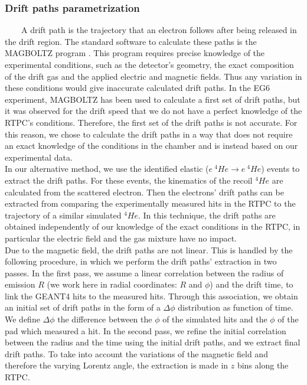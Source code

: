 \subsubsection{Drift paths parametrization}
~~~~A drift path is the trajectory that an electron follows after being released in the drift region. The standard software to calculate these paths is the MAGBOLTZ program \cite{MAGBOLTZ}. This program requires precise knowledge of the experimental conditions, such as the detector's geometry, the exact composition of the drift gas and the applied electric and magnetic fields. Thus any variation in these conditions would give inaccurate calculated drift paths. In the EG6 experiment, MAGBOLTZ has been used to calculate a first set of drift paths, but it was observed for the drift speed that we do not have a perfect knowledge of the RTPC's conditions. Therefore, the first set of the drift paths is not accurate. For this reason, we chose to calculate the drift paths in a way that does not require an exact knowledge of the conditions in the chamber and is instead based on our experimental data. \\

In our alternative method, we use the identified elastic ($e ~ ^{4}He \rightarrow e ~ ^{4}He$) events to extract the drift paths. For these events, the kinematics of the recoil $^{4}He$ are calculated from the scattered electron. Then the electrons' drift paths can be extracted from comparing the experimentally measured hits in the RTPC to the trajectory of a similar simulated $^{4}He$. In this technique, the drift paths are obtained independently of our knowledge of the exact conditions in the RTPC, in particular the electric field and the gas mixture have no impact. \\

Due to the magnetic field, the drift paths are not linear. This is handled by 
the following procedure, in which we perform the drift paths' extraction in 
two passes. In the first pass, we assume a linear correlation between the 
radius of emission $R$ (we work here in radial coordinates: $R$ and $\phi$) and the 
drift time, to link the GEANT4 hits to the measured hits. Through this association, we obtain an 
initial set of drift paths in the form of a $\Delta \phi$ distribution as function of time. We define $\Delta \phi$ the 
difference between the $\phi$ of the simulated hits and the $\phi$ of the pad 
which measured a hit. In the second pass, we refine the initial 
correlation between the radius and the time using the initial drift paths, and 
we extract final drift paths. To take into account the variations of the magnetic 
field and therefore the varying Lorentz angle, the extraction 
is made in $z$ bins along the RTPC. \\

